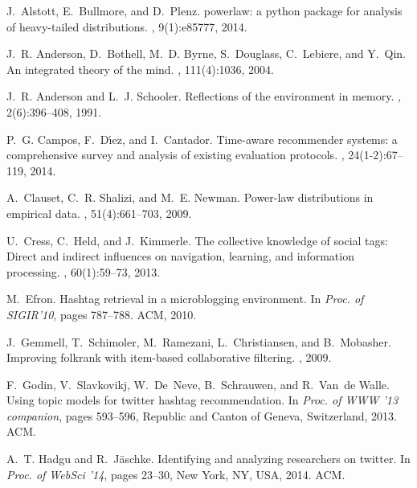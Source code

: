 \documentclass{sig-alternate-05-2015}
\begin{document}
\small

\begin{thebibliography}{10}

J.~Alstott, E.~Bullmore, and D.~Plenz.
\newblock powerlaw: a python package for analysis of heavy-tailed
  distributions.
, 9(1):e85777, 2014.

J.~R. Anderson, D.~Bothell, M.~D. Byrne, S.~Douglass, C.~Lebiere, and Y.~Qin.
\newblock An integrated theory of the mind.
, 111(4):1036, 2004.

J.~R. Anderson and L.~J. Schooler.
\newblock Reflections of the environment in memory.
, 2(6):396--408, 1991.

P.~G. Campos, F.~D{\'\i}ez, and I.~Cantador.
\newblock Time-aware recommender systems: a comprehensive survey and analysis
  of existing evaluation protocols.
, 24(1-2):67--119,
  2014.

A.~Clauset, C.~R. Shalizi, and M.~E. Newman.
\newblock Power-law distributions in empirical data.
, 51(4):661--703, 2009.

U.~Cress, C.~Held, and J.~Kimmerle.
\newblock The collective knowledge of social tags: Direct and indirect
  influences on navigation, learning, and information processing.
, 60(1):59--73, 2013.

M.~Efron.
\newblock Hashtag retrieval in a microblogging environment.
\newblock In {\em Proc. of SIGIR'10}, pages 787--788. ACM, 2010.

J.~Gemmell, T.~Schimoler, M.~Ramezani, L.~Christiansen, and B.~Mobasher.
\newblock Improving folkrank with item-based collaborative filtering.
, 2009.

F.~Godin, V.~Slavkovikj, W.~De~Neve, B.~Schrauwen, and R.~Van~de Walle.
\newblock Using topic models for twitter hashtag recommendation.
\newblock In {\em Proc. of WWW '13 companion}, pages 593--596, Republic and
  Canton of Geneva, Switzerland, 2013. ACM.

A.~T. Hadgu and R.~J{\"a}schke.
\newblock Identifying and analyzing researchers on twitter.
\newblock In {\em Proc. of WebSci '14}, pages 23--30, New York, NY, USA, 2014.
  ACM.


\end{thebibliography}
\end{document}
